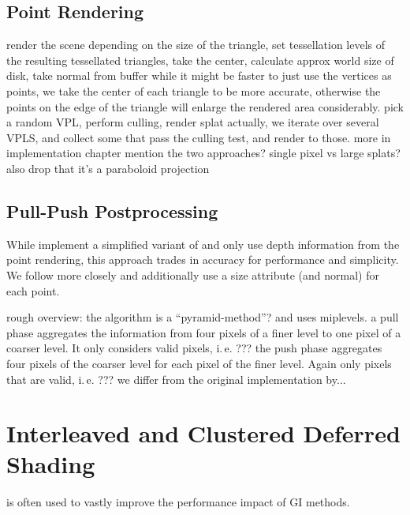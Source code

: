 \subsection{Point Rendering}
\begin{outline}
\1 render the scene
\1 depending on the size of the triangle, set tessellation levels
\1 of the resulting tessellated triangles, take the center, calculate approx world size of disk, take normal from buffer
\1 while it might be faster to just use the vertices as points, we take the center of each triangle to be more accurate, otherwise the points on the edge of the triangle will enlarge the rendered area considerably.
\1 pick a random VPL, perform culling, render splat
\1 actually, we iterate over several VPLS, and collect some that pass the culling test, and render to those. more in implementation chapter
\1 mention the two approaches? single pixel vs large splats?
\1 also drop that it's a paraboloid projection
\end{outline}

\subsection{Pull-Push Postprocessing}

\begin{outline}
\1 While \citep{ritschel2008ism} implement a simplified variant of \citet{Marroquim:2007:reconstruction} and only use depth information from the point rendering, this approach trades in accuracy for performance and simplicity. We follow \citet{Marroquim:2007:reconstruction} more closely and additionally use a size attribute (and normal) for each point.

\1 rough overview: the algorithm is a ``pyramid-method''? and uses miplevels.
\1 a pull phase aggregates the information from four pixels of a finer level to one pixel of a coarser level.
\1 It only considers valid pixels, i.\,e. ???
\1 the push phase aggregates four pixels of the coarser level for each pixel of the finer level.
\1 Again only pixels that are valid, i.\,e. ???
\1 we differ from the original implementation by...
\end{outline}



\section{Interleaved and Clustered Deferred Shading}
\label{sec:interleavedAndClusteredShading}
\citep{Keller:2001:InterleavedSampling} is often used to vastly improve the performance impact of GI methods.

